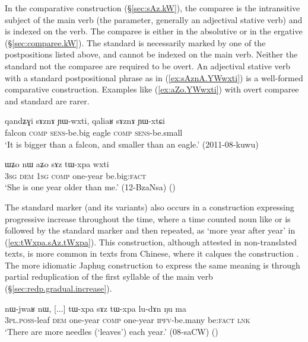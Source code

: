 In the comparative construction (§\ref{sec:sAz.kW}), the comparee is the intransitive subject of the main verb (the parameter, generally an adjectival stative verb) and is indexed on the verb. The comparee is either in the absolutive or in the ergative (§\ref{sec:comparee.kW}). The standard is necessarily marked by one of the postpositions listed above, and cannot be indexed on the main verb. Neither the standard not the comparee are required to be overt. An adjectival stative verb with a standard postpositional phrase as in  (\ref{ex:sAznA.YWwxti})  is a well-formed comparative construction. Examples like (\ref{ex:aZo.YWwxti}) with overt comparee and standard are rarer.

\begin{exe}
\ex \label{ex:sAznA.YWwxti}
\gll  qandʑɣi sɤznɤ ɲɯ-wxti, qaliaʁ sɤznɤ ɲɯ-xtɕi \\
falcon \textsc{comp} \textsc{sens}-be.big eagle \textsc{comp} \textsc{sens}-be.small \\
\glt `It is bigger than a falcon, and smaller than an eagle.' (2011-08-kuwu)
\end{exe}

\begin{exe}
\ex \label{ex:aZo.YWwxti}
\gll ɯʑo nɯ aʑo sɤz tɯ-xpa wxti  \\
\textsc{3sg} \textsc{dem} \textsc{1sg} \textsc{comp} one-year be.big:\textsc{fact} \\
\glt `She is one year older than me.' (12-BzaNsa) 	()
\end{exe}

The standard marker  (and its variants) also occurs in a  construction expressing progressive increase throughout the time, where a time counted noun like  or  is followed by the standard marker and then repeated, as  `more year after year' in (\ref{ex:tWxpa.sAz.tWxpa}). This construction, although attested in non-translated texts, is more common in texts from Chinese, where it calques the construction . The more idiomatic Japhug construction to express the same meaning is through partial reduplication of the first syllable of the main verb (§\ref{sec:redp.gradual.increase}).
 
 \begin{exe}
 \ex \label{ex:tWxpa.sAz.tWxpa}
 \gll nɯ-jwaʁ nɯ, [...] tɯ-xpa sɤz tɯ-xpa lu-dɤn ŋu ma \\
 \textsc{3pl}.\textsc{poss}-leaf \textsc{dem} { } one-year \textsc{comp} one-year \textsc{ipfv}-be.many be:\textsc{fact} \textsc{lnk} \\
\glt  `There are more needles (`leaves') each year.' (08-saCW) ()
\end{exe} 
 
